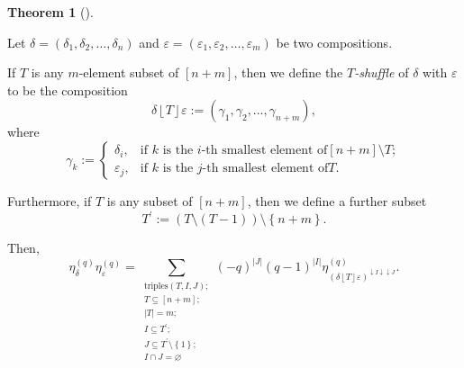 \documentclass[numbers=enddot,12pt,final,onecolumn,notitlepage]{scrartcl}%
\theoremstyle{definition}
\newtheorem{theo}{Theorem}[section]
\newenvironment{theorem}[1][]
{\begin{theo}[#1]\begin{leftbar}}
{\end{leftbar}\end{theo}}
\let\sumnonlimits\sum
\renewcommand{\sum}{\sumnonlimits\limits}
\begin{document}
\begin{theorem}
\label{thm.etaeta.EEE} Let $\delta=\left(  \delta_{1},\delta_{2},\ldots
,\delta_{n}\right)  $ and $\varepsilon=\left(  \varepsilon_{1},\varepsilon
_{2},\ldots,\varepsilon_{m}\right)  $ be two compositions.

If $T$ is any $m$-element subset of $\left[  n+m\right]  $, then we define the
$T$\emph{-shuffle} of $\delta$ with $\varepsilon$ to be the composition
\[
\delta\left\lfloor T\right\rfloor \varepsilon:=\left(  \gamma_{1},\gamma
_{2},\ldots,\gamma_{n+m}\right)  ,
\]
where
\[
\gamma_{k}:=%
\begin{cases}
\delta_{i}, & \text{if }k\text{ is the }i\text{-th smallest element of
}\left[  n+m\right]  \setminus T;\\
\varepsilon_{j}, & \text{if }k\text{ is the }j\text{-th smallest element of
}T.
\end{cases}
\]


Furthermore, if $T$ is any subset of $\left[  n+m\right]  $, then we define a
further subset%
\[
T^{\prime}:=\left(  T\setminus\left(  T-1\right)  \right)  \setminus\left\{
n+m\right\}  .
\]


Then,%
\[
\eta_{\delta}^{(q)}\eta_{\varepsilon}^{(q)}=\sum_{\substack{\text{triples
}\left(  T,I,J\right)  ;\\T\subseteq\left[  n+m\right]  ;\\\left\vert
T\right\vert =m;\\I\subseteq T^{\prime};\\J\subseteq T^{\prime}\setminus
\left\{  1\right\}  ;\\I\cap J=\varnothing}}\left(  -q\right)  ^{\left\vert
J\right\vert }\left(  q-1\right)  ^{\left\vert I\right\vert }\eta_{\left(
\delta\left\lfloor T\right\rfloor \varepsilon\right)  ^{\downarrow
I\downarrow\downarrow J}}^{\left(  q\right)  }.
\]

\end{theorem}
\end{document}
